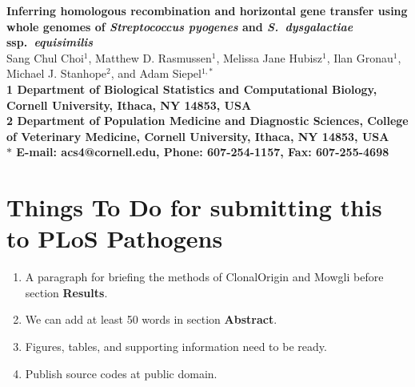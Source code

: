 \documentclass[10pt]{article}
\date{}
\begin{document}
\begin{flushleft}
{\Large
\textbf{Inferring homologous recombination and horizontal gene transfer 
using whole genomes of \textit{Streptococcus pyogenes} 
and\textit{ S.\ dysgalactiae} ssp.\textit{\ equisimilis}}
}
\\
Sang Chul Choi$^{1}$, Matthew D. Rasmussen$^{1}$, 
Melissa Jane Hubisz$^{1}$, Ilan Gronau$^{1}$,
Michael J. Stanhope$^{2}$, and Adam Siepel$^{1,\ast}$
\\
\bf{1} 
Department of Biological Statistics and Computational Biology,
Cornell University, Ithaca, NY 14853, USA
\\
\bf{2}
Department of Population Medicine and Diagnostic Sciences,
College of Veterinary Medicine, Cornell University, Ithaca, NY 14853, USA
\\
$\ast$ E-mail: acs4@cornell.edu, Phone: 607-254-1157, Fax: 607-255-4698
\end{flushleft}

\section*{Things To Do for submitting this to PLoS Pathogens}
\begin{enumerate}
\item A paragraph for briefing the methods of ClonalOrigin and Mowgli before
section \textbf{Results}.
\item We can add at least 50 words in section \textbf{Abstract}.
\item Figures, tables, and supporting information need to be ready.
\item Publish source codes at public domain.
\end{enumerate}
\end{document}
